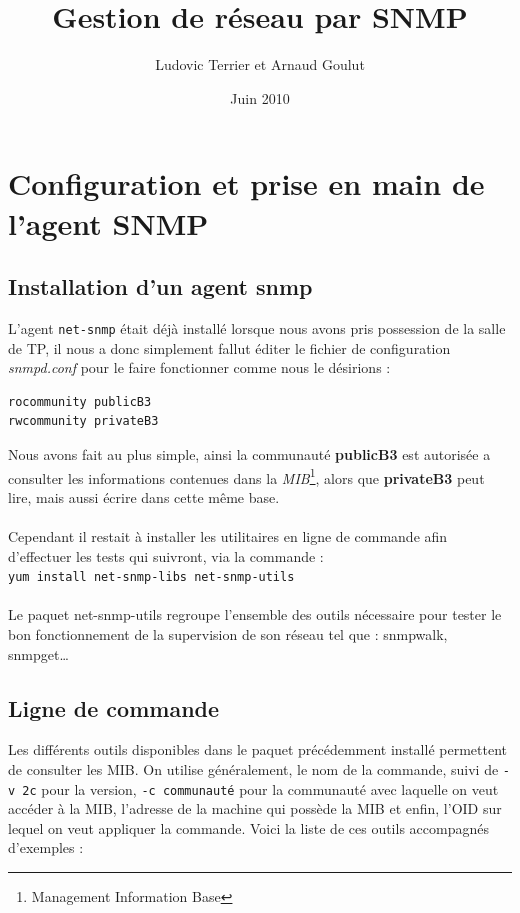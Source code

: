 \documentclass[12pt,a4paper,notitlepage]{article}
\begin{document}
\title{Gestion de réseau par SNMP}
\author{Ludovic Terrier et Arnaud Goulut}
\date{Juin 2010}
\maketitle



\thispagestyle{empty}


 
\section{Configuration et prise en main de l'agent SNMP}

\subsection{Installation d'un agent snmp}
L'agent \texttt{net-snmp} était déjà installé lorsque nous avons pris possession de la salle de TP, il nous a donc simplement fallut éditer le fichier de configuration \textit{snmpd.conf} pour le faire fonctionner comme nous le désirions :
\begin{lstlisting}[title=snmpd.conf]
rocommunity publicB3
rwcommunity privateB3
\end{lstlisting}

Nous avons fait au plus simple, ainsi la communauté \textbf{publicB3} est autorisée a consulter les informations contenues dans la \textit{MIB}\footnote{Management Information Base}, alors que \textbf{privateB3} peut lire, mais aussi écrire dans cette même base.


\paragraph{}Cependant il restait à installer les utilitaires en ligne de commande afin d'effectuer les tests qui suivront, via la commande :\\

\noindent \texttt{yum install net-snmp-libs net-snmp-utils}

\paragraph{}Le paquet net-snmp-utils regroupe l'ensemble des outils nécessaire pour tester le bon fonctionnement de la supervision de son réseau tel que : snmpwalk, snmpget\ldots 
\subsection{Ligne de commande}
Les différents outils disponibles dans le paquet précédemment installé permettent de consulter les MIB. On utilise généralement, le nom de la commande, suivi de \texttt{-v 2c} pour la version, \texttt{-c communauté} pour la communauté avec laquelle on veut accéder à la MIB, l'adresse de la machine qui possède la MIB et enfin, l'OID sur lequel on veut appliquer la commande. Voici la liste de ces outils accompagnés d'exemples :\\
\end{document}
